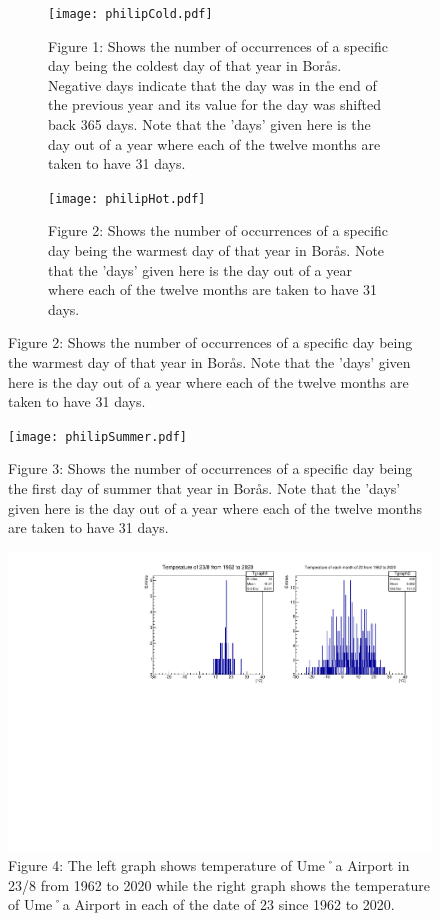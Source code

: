 \documentclass[a4, 12pt]{article}
\begin{document}
\begin{figure}[H]
\centering
\begin{subfigure}{.5\textwidth}
  \centering
  \captionsetup{width = 0.9\linewidth}
  \texttt{[image: philipCold.pdf]}
   \caption*{Figure 1: Shows the number of occurrences of a specific day being the coldest day of that year in Borås. Negative days indicate that the day was in the end of the previous year and its value for the day was shifted back 365 days. Note that the 'days' given here is the day out of a year where each of the twelve months are taken to have 31 days.
   }
\end{subfigure}\hfill
\begin{subfigure}{.5\textwidth}
  \centering
  \captionsetup{width = 0.9\linewidth}
  \texttt{[image: philipHot.pdf]}
  \caption*{Figure 2: Shows the number of occurrences of a specific day being the warmest day of that year in Borås. Note that the 'days' given here is the day out of a year where each of the twelve months are taken to have 31 days. \newline \newline \newline  \mbox{         }}
\end{subfigure}

\end{figure}



\begin{figure}[H]
\centering
\texttt{[image: philipSummer.pdf]}
\caption*{Figure 3: Shows the number of occurrences of a specific day being the first day of summer that year in Borås. Note that the 'days' given here is the day out of a year where each of the twelve months are taken to have 31 days.}
\end{figure}
\newpage






\begin{figure}[H]
\centering
\includegraphics[scale=0.5]{chrisFig4.pdf}
 \caption*{Figure 4: The left graph shows temperature of Ume˚a Airport in 23/8 from 1962 to 2020 while the right graph shows the temperature of Ume˚a Airport in each of the date of 23 since 1962 to 2020.}

\end{figure}
\end{document}
